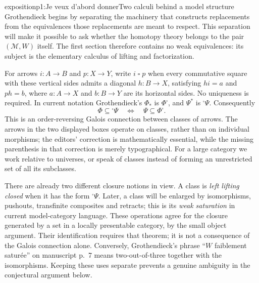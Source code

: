 \begin{dcomment}{exposition}{p1:Je veux d'abord donner}{Two calculi behind a model structure}
Grothendieck begins by separating the machinery that constructs replacements from the equivalences those replacements are meant to respect. This separation will make it possible to ask whether the homotopy theory belongs to the pair $(\mathcal M,W)$ itself. The first section therefore contains no weak equivalences: its subject is the elementary calculus of lifting and factorization.

For arrows $i:A\to B$ and $p:X\to Y$, write $i\mathrel{\square}p$ when every commutative square with these vertical sides admits a diagonal $h:B\to X$, satisfying $hi=a$ and $ph=b$, where $a:A\to X$ and $b:B\to Y$ are its horizontal sides. No uniqueness is required. In current notation Grothendieck's $\Phi_*$ is $\Phi^{\square}$, and $\Psi^*$ is ${}^{\square}\Psi$. Consequently
\[
 \Phi\subseteq{}^{\square}\Psi
 \quad\Longleftrightarrow\quad
 \Psi\subseteq\Phi^{\square}.
\]
This is an order-reversing Galois connection between classes of arrows. The arrows in the two displayed boxes operate on classes, rather than on individual morphisms; the editors' correction is mathematically essential, while the missing parenthesis in that correction is merely typographical. For a large category we work relative to universes, or speak of classes instead of forming an unrestricted set of all its subclasses.

There are already two different closure notions in view. A class is \emph{left lifting closed} when it has the form ${}^{\square}\Psi$. Later, a class will be enlarged by isomorphisms, pushouts, transfinite composites and retracts; this is its \emph{weak saturation} in current model-category language. These operations agree for the closure generated by a set in a locally presentable category, by the small object argument. Their identification requires that theorem; it is not a consequence of the Galois connection alone. Conversely, Grothendieck's phrase ``$W$ faiblement saturée'' on manuscript p.~7 means two-out-of-three together with the isomorphisms. Keeping these uses separate prevents a genuine ambiguity in the conjectural argument below.
\end{dcomment}


